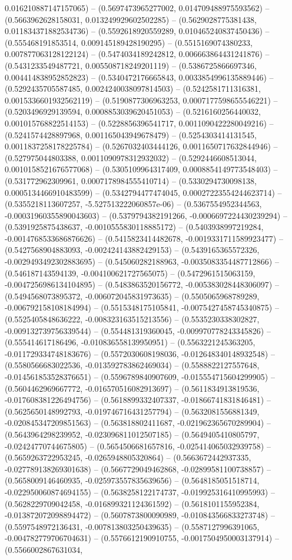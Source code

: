 0.016210887147157065) -- (0.5697473965277002, 0.014709488975593562) -- (0.5663962628158031, 0.013249929602502285) -- (0.5629028775381438, 0.011834371882534736) -- (0.5592618920559289, 0.010465240837450436) -- (0.555468191853514, 0.009145189428190295) -- (0.5515169074380233, 0.007877063128122124) -- (0.5474034189242812, 0.006663864431241876) -- (0.5431233549487721, 0.005508718249201119) -- (0.5386725866697346, 0.004414838952852823) -- (0.5340472176665843, 0.0033854996135889446) -- (0.5292435705587485, 0.0024240038097814503) -- (0.5242581711316381, 0.0015336601932562119) -- (0.5190877306963253, 0.0007177598655546221) -- (0.5203496929139594, 0.0008853039620451053) -- (0.5216160256440032, 0.001015768822514153) -- (0.5228856396541717, 0.0011090422280049216) -- (0.5241574428897968, 0.001165043949678479) -- (0.5254303414131545, 0.0011837258178225784) -- (0.5267032403444126, 0.0011650717632844946) -- (0.527975044803388, 0.0011090978312932032) -- (0.5292446608513044, 0.0010158521676577068) -- (0.5305109964317409, 0.0008854149773548403) -- (0.531772962309961, 0.0007178984555410714) -- (0.5330294730098138, 0.0005134466910483599) -- (0.5342794477474045, 0.00027223554244623714) -- (0.5355218113607257, -5.527513222060857e-06) -- (0.5367554952344563, -0.00031960355890043603) -- (0.5379794382191266, -0.0006697224430239294) -- (0.5391925875438637, -0.0010555830118885172) -- (0.5403938997219284, -0.0014768533686876626) -- (0.5415823414482678, -0.0019331711589923477) -- (0.5427568904883093, -0.002424143882429153) -- (0.5439165365572326, -0.0029493492302883695) -- (0.545060282188963, -0.0035083354487712866) -- (0.546187143594139, -0.004100621727565075) -- (0.5472961515063159, -0.0047256986134104895) -- (0.5483863520156772, -0.005383028448306097) -- (0.5494568073895372, -0.006072045831973635) -- (0.5505065968789289, -0.006792158108184994) -- (0.5515348175105841, -0.0075427458745340875) -- (0.5525405848636222, -0.008323163515213556) -- (0.5535230338302827, -0.009132739756339544) -- (0.554481319360045, -0.009970778243345826) -- (0.555414617186496, -0.010836558139950951) -- (0.5563221245363205, -0.011729334748183676) -- (0.5572030608198036, -0.012648340148932548) -- (0.5580566683022536, -0.013592783862469034) -- (0.5588822127557648, -0.014561853528376651) -- (0.5596789840907609, -0.015554715604299905) -- (0.5604462969667772, -0.016570516082913697) -- (0.5611834913819536, -0.017608381226494756) -- (0.5618899332407337, -0.01866741831846481) -- (0.5625650148992793, -0.019746716431257794) -- (0.5632081556881349, -0.020845347209851563) -- (0.563818802411687, -0.021962365670289904) -- (0.5643964298239952, -0.023096811012507185) -- (0.5649405410805797, -0.02424770744675805) -- (0.5654506681657816, -0.025414065032939758) -- (0.5659263722953245, -0.0265948805320864) -- (0.5663672442937335, -0.027789138269301638) -- (0.5667729049462868, -0.02899581100738857) -- (0.5658009146460935, -0.025973557835639656) -- (0.5648185051518714, -0.022950060874694155) -- (0.5638258122174737, -0.019925316410995993) -- (0.5628229709042458, -0.016899321124361592) -- (0.5618101155952384, -0.013872072098894472) -- (0.5607873800090989, -0.010843566833273748) -- (0.5597548972136431, -0.007813803250439635) -- (0.5587127996391065, -0.004782779706704631) -- (0.5576612190910755, -0.0017504950003137914) -- (0.5566002867631034, 